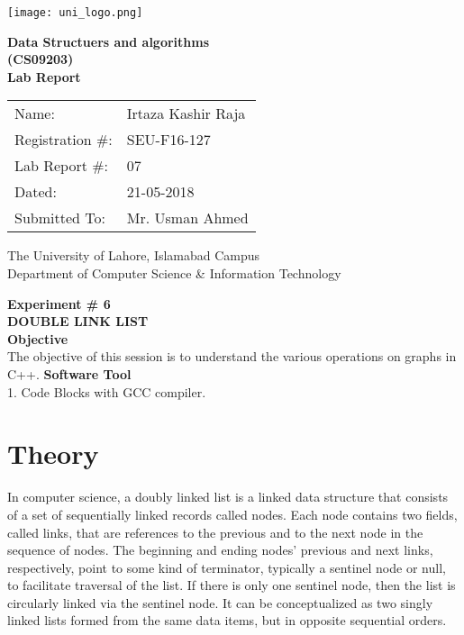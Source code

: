 \documentclass[11pt]{article}            %
\begin{document}
\begin{titlepage}
    \centering
  \vfill
    \texttt{[image: uni\_logo.png]} \\ 
	\vskip2cm
    {\bfseries\Large
	Data Structuers and algorithms \\ (CS09203)\\
	
	\vskip2cm
	Lab Report 
	 
	\vskip2cm
	}    

\begin{center}
\begin{tabular}{ l l  } 

Name: & Irtaza Kashir Raja \\ 
Registration \#: & SEU-F16-127 \\ 
Lab Report \#: & 07 \\ 
 Dated:& 21-05-2018\\ 
Submitted To:& Mr. Usman Ahmed\\ 

\end{tabular}
\end{center}
    \vfill
    The University of Lahore, Islamabad Campus\\
Department of Computer Science \& Information Technology
\end{titlepage}


    
    {\bfseries\Large
\centering
	Experiment \# 6 \\

DOUBLE LINK LIST \\
	
	}    
 \vskip1cm
 \textbf {Objective}\\ The objective of this session is to understand the various operations on graphs in C++.
 \textbf {Software Tool} \\
 1. Code Blocks with GCC compiler.

\section{Theory }              
In computer science, a doubly linked list is a linked data structure that consists of a set of sequentially linked records called nodes. Each node contains two fields, called links, that are references to the previous and to the next node in the sequence of nodes. The beginning and ending nodes' previous and next links, respectively, point to some kind of terminator, typically a sentinel node or null, to facilitate traversal of the list. If there is only one sentinel node, then the list is circularly linked via the sentinel node. It can be conceptualized as two singly linked lists formed from the same data items, but in opposite sequential orders.
\end{document}

